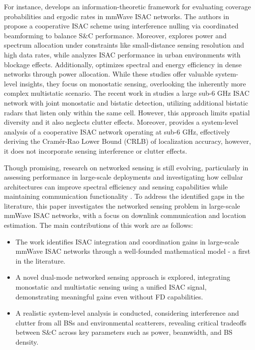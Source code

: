 \documentclass[journal]{IEEEtran}
\begin{document}
For instance, \cite{olson2023coverage} develops an information-theoretic framework for evaluating coverage probabilities and ergodic rates in mmWave ISAC networks. The authors in \cite{meng2024network} propose a cooperative ISAC scheme using interference nulling via coordinated beamforming to balance S\&C performance. Moreover, \cite{xu2024performance} explores power and spectrum allocation under constraints like small-distance sensing resolution and high data rates, while \cite{sun2024performance} analyzes ISAC performance in urban environments with blockage effects. Additionally, \cite{salem2024rethinking} optimizes spectral and energy efficiency in dense networks through power allocation. While these studies offer valuable system-level insights, they focus on monostatic sensing, overlooking the inherently more complex multistatic scenario.
The recent work in \cite{ali2025integrated} studies a large sub-6 GHz ISAC network with joint monostatic and bistatic detection, utilizing additional bistatic radars that listen only within the same cell. However, this approach limits spatial diversity and it also neglects clutter effects.
Moreover, \cite{10769538} provides a system-level analysis of a cooperative ISAC network operating at sub-6 GHz, effectively deriving the Cramér-Rao Lower Bound (CRLB) of localization accuracy, however, it does not incorporate sensing interference or clutter effects.

Though promising, research on networked sensing is still evolving, particularly in assessing performance in large-scale deployments and investigating how cellular architectures can improve spectral efficiency and sensing capabilities while maintaining communication functionality \cite{liu2022integrated,zhang2021enabling,cui2024integrated,lu2024integrated}. 
To address the identified gaps in the literature, this paper investigates the networked sensing problem in large-scale mmWave ISAC networks, with a focus on downlink communication and location estimation. The main contributions of this work are as follows:
\begin{itemize}
\item The work identifies ISAC integration and coordination gains in large-scale mmWave ISAC networks through a well-founded mathematical model - a first in the literature. 
    \item A novel dual-mode networked sensing approach is explored, integrating monostatic and multistatic sensing using a unified ISAC signal, demonstrating meaningful gains even without FD capabilities.
\item A realistic system-level analysis is conducted, considering interference and clutter from all BSs and environmental scatterers, revealing critical tradeoffs between S\&C across key parameters such as power, beamwidth, and BS density.
\end{itemize}
\end{document}

